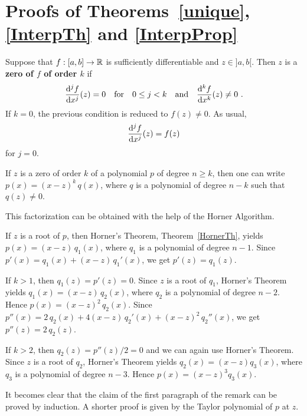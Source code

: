 \section{Proofs of Theorems~\ref{unique}, \ref{InterpTh} and
\ref{InterpProp}} \label{approx_proofs}

\begin{defn}
Suppose that $f:[a,b]\rightarrow \mathbb{R}$ is sufficiently differentiable
and $z\in ]a,b[$.  Then $z$ is a
{\bfseries zero of $f$ of order $k$} if
\[
\frac{\mathrm{d}^{j}{f}}{\mathrm{d}{x}^{j}}(z) = 0 \quad \text{for} \quad 0\leq j < k \quad
\text{and} \quad \frac{\mathrm{d}^{k}{f}}{\mathrm{d}{x}^{k}}(z) \neq 0 \ .
\]
If $k=0$, the previous condition is reduced to $f(z)\neq 0$.  As
usual,
\[
\frac{\mathrm{d}^{j}{f}}{\mathrm{d}{x}^{j}}(z) = f(z)
\]
for $j=0$.
\end{defn}

\begin{lemma} \label{FactPolyRoot}
If $z$ is a zero of order $k$ of a polynomial $p$ of degree
$n\geq k$, then one can write $p(x) = (x-z)^k\,q(x)$, where $q$ is a
polynomial of degree $n-k$ such that $q(z)\neq 0$.
\end{lemma}

This factorization can be obtained with the help of the Horner Algorithm.

If $z$ is a root of $p$, then Horner's Theorem,
Theorem~\ref{HornerTh}, yields $p(x) = (x-z)\,q_1(x)$, where $q_1$ is
a polynomial of degree $n-1$. Since $p'(x) = q_1(x) + (x-z)\,q_1'(x)$,
we get $p'(z) = q_1(z)$.

If $k>1$, then $q_1(z) = p'(z) =0$.  Since $z$ is a root of
$q_1$, Horner's Theorem yields $q_1(x) = (x-z)\,q_2(x)$, where $q_2$ is
a polynomial of degree $n-2$.  Hence $p(x) = (x-z)^2\,q_2(x)$.  Since
$p''(x) = 2\,q_2(x) + 4(x-z)\,q_2'(x) + (x-z)^2\, q_2''(x)$, we get
$p''(z) = 2 \,q_2(z)$.

If $k>2$, then $q_2(z) = p''(z)/2 = 0$ and we can again use Horner's
Theorem.  Since $z$ is a root of $q_2$, Horner's Theorem yields
$q_2(x) = (x-z)q_3(x)$, where $q_3$ is a polynomial of degree $n-3$.
Hence $p(x) = (x-z)^3q_3(x)$.

It becomes clear that the claim of the first paragraph of the remark
can be proved by induction.  A shorter proof is given by the Taylor
polynomial of $p$ at $z$.

